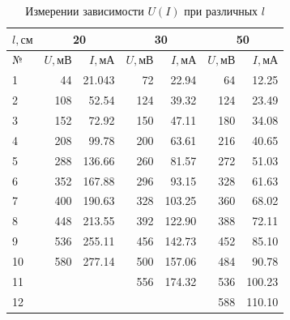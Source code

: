 \documentclass[a4paper, 12pt]{article}
\begin{document}
    \newpage

    \begin{table}[H]
        \begin{center}

        \begin{tabular}{|l|r|r|r|r|r|r|}
        \hline
        $l, см$ & \multicolumn{2}{c|}{20} & \multicolumn{2}{c|}{30} & \multicolumn{2}{c|}{50} \\
        \hline
        {№} &      $U, мВ$ &        $I, мА$&      $U, мВ$ &         $I, мА$ &    $U, мВ$ &         $I, мА$ \\
        \hline \rowcolor{Gray}
        1  &   44 &   21.043 &   72 &   22.94 &   64 &   12.25 \\
        2  &  108 &   52.54  &  124 &   39.32 &  124 &   23.49 \\\rowcolor{Gray}
        3  &  152 &   72.92  &  150 &   47.11 &  180 &   34.08 \\
        4  &  208 &   99.78  &  200 &   63.61 &  216 &   40.65 \\\rowcolor{Gray}
        5  &  288 &  136.66  &  260 &   81.57 &  272 &   51.03 \\
        6  &  352 &  167.88  &  296 &   93.15 &  328 &   61.63 \\\rowcolor{Gray}
        7  &  400 &  190.63  &  328 &  103.25 &  360 &   68.02 \\
        8  &  448 &  213.55  &  392 &  122.90 &  388 &   72.11 \\\rowcolor{Gray}
        9  &  536 &  255.11  &  456 &  142.73 &  452 &   85.10 \\
        10 &  580 &  277.14  &  500 &  157.06 &  484 &   90.78 \\\rowcolor{Gray}
        11 &      &          &  556 &  174.32 &  536 &  100.23 \\
        12 &      &          &      &         &  588 &  110.10 \\
        \hline
        \end{tabular}
            \caption{Измерении зависимости $U(I)$ при различных $l$}
        \end{center}

    \end{table}

    \paragraph{}
\end{document}
